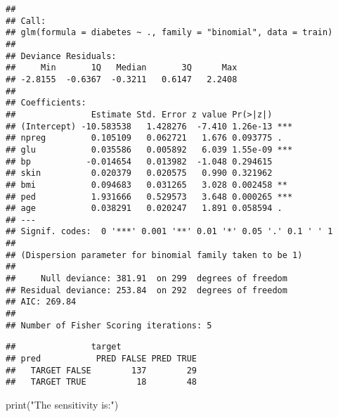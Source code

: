 \documentclass[
]{article}
\newenvironment{Shaded}{\begin{snugshade}}{\end{snugshade}}
\newcommand{\AttributeTok}[1]{\textcolor[rgb]{0.77,0.63,0.00}{#1}}
\newcommand{\DecValTok}[1]{\textcolor[rgb]{0.00,0.00,0.81}{#1}}
\newcommand{\FloatTok}[1]{\textcolor[rgb]{0.00,0.00,0.81}{#1}}
\newcommand{\FunctionTok}[1]{\textcolor[rgb]{0.00,0.00,0.00}{#1}}
\newcommand{\NormalTok}[1]{#1}
\newcommand{\OtherTok}[1]{\textcolor[rgb]{0.56,0.35,0.01}{#1}}
\newcommand{\SpecialCharTok}[1]{\textcolor[rgb]{0.00,0.00,0.00}{#1}}
\newcommand{\StringTok}[1]{\textcolor[rgb]{0.31,0.60,0.02}{#1}}
\begin{document}
\begin{verbatim}
## 
## Call:
## glm(formula = diabetes ~ ., family = "binomial", data = train)
## 
## Deviance Residuals: 
##     Min       1Q   Median       3Q      Max  
## -2.8155  -0.6367  -0.3211   0.6147   2.2408  
## 
## Coefficients:
##               Estimate Std. Error z value Pr(>|z|)    
## (Intercept) -10.583538   1.428276  -7.410 1.26e-13 ***
## npreg         0.105109   0.062721   1.676 0.093775 .  
## glu           0.035586   0.005892   6.039 1.55e-09 ***
## bp           -0.014654   0.013982  -1.048 0.294615    
## skin          0.020379   0.020575   0.990 0.321962    
## bmi           0.094683   0.031265   3.028 0.002458 ** 
## ped           1.931666   0.529573   3.648 0.000265 ***
## age           0.038291   0.020247   1.891 0.058594 .  
## ---
## Signif. codes:  0 '***' 0.001 '**' 0.01 '*' 0.05 '.' 0.1 ' ' 1
## 
## (Dispersion parameter for binomial family taken to be 1)
## 
##     Null deviance: 381.91  on 299  degrees of freedom
## Residual deviance: 253.84  on 292  degrees of freedom
## AIC: 269.84
## 
## Number of Fisher Scoring iterations: 5
\end{verbatim}

\begin{Shaded}
\end{Shaded}

\begin{verbatim}
##               target
## pred           PRED FALSE PRED TRUE
##   TARGET FALSE        137        29
##   TARGET TRUE          18        48
\end{verbatim}

\begin{Shaded}
\begin{Highlighting}[]
\FunctionTok{print}\NormalTok{(}\StringTok{"The sensitivity is:"}\NormalTok{)}
\end{Highlighting}
\end{Shaded}
\end{document}
